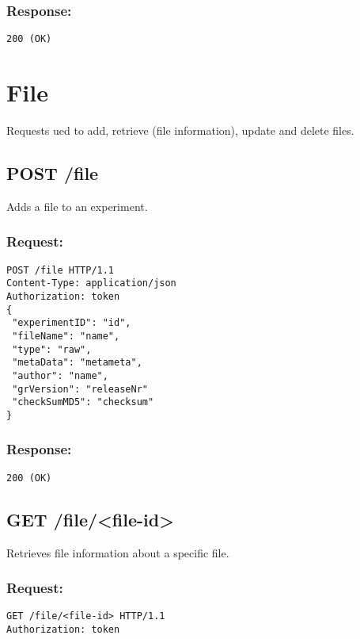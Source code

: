 \subsubsection*{Response:}
\begin{verbatim}
200 (OK)
\end{verbatim}

\section*{File}

Requests ued to add, retrieve (file information), update and delete files.

\subsection*{POST /file}

Adds a file to an experiment.

\subsubsection*{Request:}
\begin{verbatim}
POST /file HTTP/1.1
Content-Type: application/json
Authorization: token
{ 
 "experimentID": "id",
 "fileName": "name",
 "type": "raw",
 "metaData": "metameta",
 "author": "name",
 "grVersion": "releaseNr"
 "checkSumMD5": "checksum"
}
\end{verbatim}

\subsubsection*{Response:}
\begin{verbatim}
200 (OK)
\end{verbatim}

\subsection*{GET /file/<file-id>}

Retrieves file information about a specific file.

\subsubsection*{Request:}
\begin{verbatim}
GET /file/<file-id> HTTP/1.1
Authorization: token
\end{verbatim}

